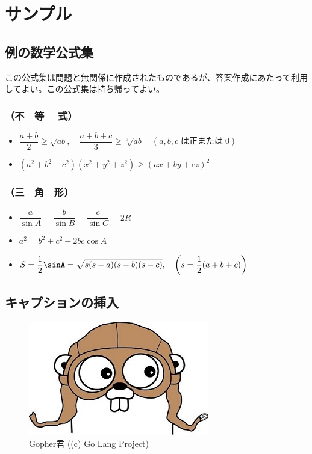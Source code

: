 \documentclass[10pt]{article}
\makeatletter
\def\maxwidth{\ifdim\Gin@nat@width>\linewidth\linewidth
\else\Gin@nat@width\fi}
\let\Oldincludegraphics\includegraphics
\renewcommand{\includegraphics}[1]{\Oldincludegraphics[width=\maxwidth]{#1}}
\makeatother
\begin{document}
\section{サンプル}

\subsection{例の数学公式集}

この公式集は問題と無関係に作成されたものであるが、答案作成にあたって利用してよい。この公式集は持ち帰ってよい。

\subsubsection{（不　等　 式）}

\begin{itemize}
\item
  \(\dfrac{a+b}{2}\ge \sqrt{ab}, \quad \dfrac{a+b+c}{3}\ge \sqrt[3]{ab} \quad (a, b, c \;\mbox{は正または}\;0)\)
\item
  \((a^2+b^2+c^2)(x^2+y^2+z^2)\ge(ax+by+cz)^2\)
\end{itemize}

\subsubsection{（三　角　形）}

\begin{itemize}
\item
  \(\dfrac{a}{\sin A} = \dfrac{b}{\sin B} = \dfrac{c}{\sin C} = 2R\)
\item
  \(a^2=b^2+c^2 - 2bc \cos A\)
\item
  \(S=\dfrac12\sinA=\sqrt{s(s-a)(s-b)(s-c)}, \quad \left(s=\dfrac12(a+b+c)\right)\)
\end{itemize}

\subsection{キャプションの挿入}

\begin{figure}[htbp]
\centering
\includegraphics{img/goprogramminglanguage.jpg}
\caption{Gopher君 ((c) Go Lang Project)}
\end{figure}
\end{document}
